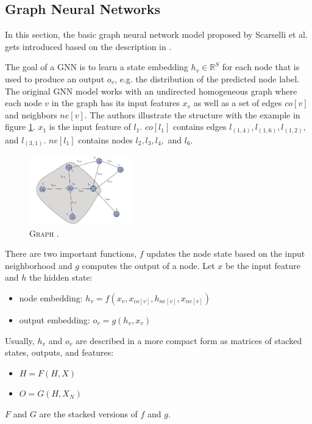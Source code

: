 \documentclass[a4paper,preprint]{sig-alternate}
\begin{document}
\subsection{Graph Neural Networks}

In this section, the basic graph neural network model proposed by Scarselli et al. \cite{4700287} gets introduced
based on the description in \cite{article}.\newline

The goal of a GNN is to learn a state embedding $h_v \in \mathbb{R}^S$ for each node that is used to produce an 
output $o_v$, e.g. the distribution of the predicted node label.
The original GNN model works with an undirected homogeneous graph where each node $v$ in the graph has its input features $x_v$
as well as a set of edges $co[v]$ and neighbors $ne[v]$.\newline
The authors illustrate the structure with the example in figure \ref{fig:graph}.
$x_{1}$ is the input feature of $l_1$. $co[l_1]$ contains edges $l_{(1, 4)}, l_{(1, 6)}, l_{(1, 2)}$, and $l_{(3, 1)}$. $ne[l_1]$ contains nodes $l_2, l_3,
l_4,$ and $l_6$.

\begin{figure}[h]
    \centering
    \includegraphics[width=0.4\textwidth]{img/graph.png}
    \caption{\textsc{Graph} \cite{goodfellow2015explaining}.}
    \label{fig:graph}
\end{figure}

There are two important functions, $f$ updates the node state based on the input neighborhood and $g$ computes the output of a node.\newline
Let $x$ be the input feature and $h$ the hidden state:
\begin{itemize}
    \item node embedding: $h_v = f(x_v, x_{co[v]}, h_{ne[v]}, x_{ne[v]})$
    \item output embedding: $o_v = g(h_v, x_v)$
\end{itemize}

Usually, $h_v$ and $o_v$ are described in a more compact form as matrices of stacked states,
outputs, and features:
\begin{itemize}
    \item $H = F(H, X)$
    \item $O = G(H, X_N)$
\end{itemize}
$F$ and $G$ are the stacked versions of $f$ and $g$.\newline
\end{document}
